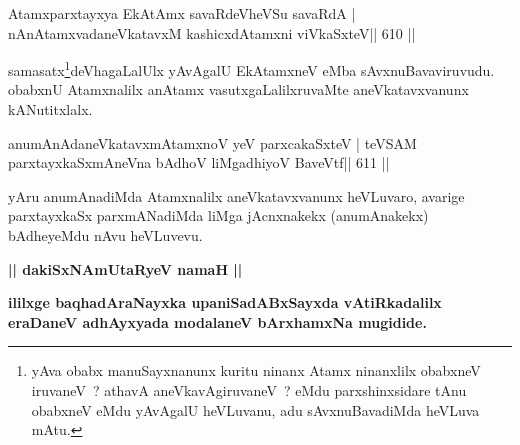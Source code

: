 \begin{shl}
Atamxparxtayxya EkAtAmx savaRdeVheVSu savaRdA |
nAnAtamxvadaneVkatavxM kashicxdAtamxni viVkaSxteV\hfill || 610 ||
\end{shl}

\begin{artha}
samasatx\footnote{yAva obabx manuSayxnanunx kuritu ninanx Atamx   ninanxlilx obabxneV iruvaneV~? athavA aneVkavAgiruvaneV~? eMdu   parxshinxsidare tAnu obabxneV eMdu yAvAgalU heVLuvanu, adu   sAvxnuBavadiMda heVLuva mAtu.}deVhagaLalUlx yAvAgalU EkAtamxneV eMba sAvxnuBavaviruvudu. obabxnU Atamxnalilx anAtamx vasutxgaLalilxruvaMte aneVkatavxvanunx kANutitxlalx.
\end{artha}

\begin{shl}
anumAnAdaneVkatavxmAtamxnoV yeV parxcakaSxteV |
teVSAM parxtayxkaSxmAneVna bAdhoV liMgadhiyoV BaveVtf\hfill || 611 ||
\end{shl}

\begin{artha}
yAru anumAnadiMda Atamxnalilx aneVkatavxvanunx heVLuvaro, avarige parxtayxkaSx parxmANadiMda liMga jAcnxnakekx (anumAnakekx) bAdheyeMdu nAvu heVLuvevu.
\end{artha}


\begin{center}
{\Large{\textbf{|| dakiSxNAmUtaRyeV namaH ||}}}

{\textbf{ililxge baqhadAraNayxka upaniSadABxSayxda vAtiRkadalilx eraDaneV adhAyxyada modalaneV bArxhamxNa mugidide.}}
\end{center}
